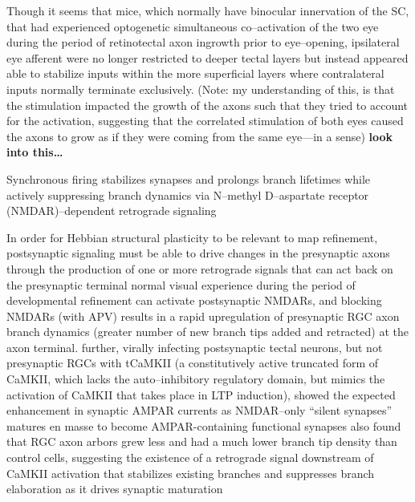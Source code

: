\documentclass[11pt, a4paper, oneside]{article}   	%
\begin{document}
\begin{outline}
        \subsubpoint Though it seems that mice, which normally have binocular innervation of the SC, that had experienced optogenetic simultaneous co--activation of the two eye during the period of retinotectal axon ingrowth prior to eye--opening, ipsilateral eye afferent were no longer restricted to deeper tectal layers but instead appeared able to stabilize inputs within the more superficial layers where contralateral inputs normally terminate exclusively.
        \supersubpoint (Note: my understanding of this, is that the stimulation impacted the growth of the axons such that they tried to account for the activation, suggesting that the correlated stimulation of both eyes caused the axons to grow as if they were coming from the same eye---in a sense) \textbf{look into this\ldots}

    \subpoint Synchronous firing stabilizes synapses and prolongs branch lifetimes while actively suppressing branch dynamics via N--methyl D--aspartate receptor (NMDAR)--dependent retrograde signaling

        \subsubpoint In order for Hebbian structural plasticity to be relevant to map refinement, postsynaptic signaling must be able to drive changes in the presynaptic axons through the production of one or more retrograde signals that can act back on the presynaptic terminal
        \subsubpoint normal visual experience during the period of developmental refinement can activate postsynaptic NMDARs, and blocking NMDARs (with APV) results in a rapid upregulation of presynaptic RGC axon branch dynamics (greater number of new branch tips added and retracted) at the axon terminal.
        \subsubpoint further, virally infecting postsynaptic tectal neurons, but not presynaptic RGCs with tCaMKII (a constitutively active truncated form of CaMKII, which lacks the auto--inhibitory regulatory domain, but mimics the activation of CaMKII that takes place in LTP induction), showed the expected enhancement in synaptic AMPAR currents as NMDAR--only ``silent synapses'' matures en masse to become AMPAR-containing functional synapses
            \supersubpoint also found that RGC axon arbors grew less and had a much lower branch tip density than control cells, suggesting the existence of a retrograde signal downstream of CaMKII activation that stabilizes existing branches and suppresses branch elaboration as it drives synaptic maturation


\end{outline}
\end{document}
